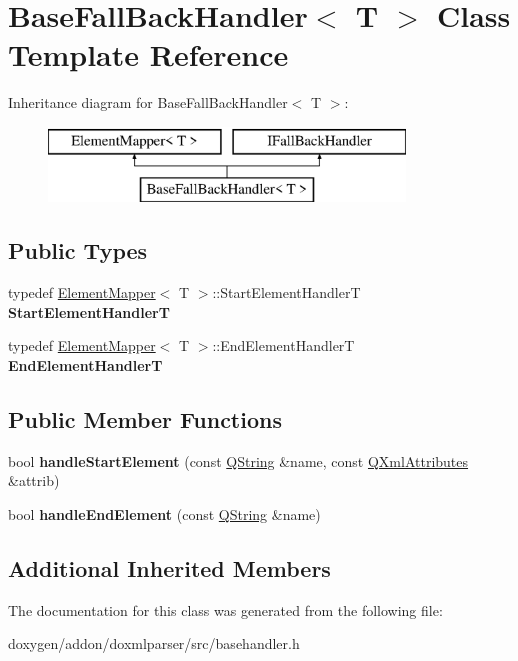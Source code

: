 \hypertarget{class_base_fall_back_handler}{}\section{Base\+Fall\+Back\+Handler$<$ T $>$ Class Template Reference}
\label{class_base_fall_back_handler}
Inheritance diagram for Base\+Fall\+Back\+Handler$<$ T $>$\+:\begin{figure}[H]
\begin{center}
\leavevmode
\includegraphics[height=2.000000cm]{class_base_fall_back_handler}
\end{center}
\end{figure}
\subsection*{Public Types}
\begin{DoxyCompactItemize}
\item 
\mbox{\label{class_base_fall_back_handler_ae0b24b5e229ec8d344add1a692d1df81}} 
typedef \mbox{\hyperlink{class_element_mapper}{Element\+Mapper}}$<$ T $>$\+::Start\+Element\+HandlerT {\bfseries Start\+Element\+HandlerT}
\item 
\mbox{\label{class_base_fall_back_handler_a8bc73d6cf9414a905eab6051beb1461e}} 
typedef \mbox{\hyperlink{class_element_mapper}{Element\+Mapper}}$<$ T $>$\+::End\+Element\+HandlerT {\bfseries End\+Element\+HandlerT}
\end{DoxyCompactItemize}
\subsection*{Public Member Functions}
\begin{DoxyCompactItemize}
\item 
\mbox{\label{class_base_fall_back_handler_a3664d08104bb0f5812bf7ab3b13b72ce}} 
bool {\bfseries handle\+Start\+Element} (const \mbox{\hyperlink{class_q_string}{Q\+String}} \&name, const \mbox{\hyperlink{class_q_xml_attributes}{Q\+Xml\+Attributes}} \&attrib)
\item 
\mbox{\label{class_base_fall_back_handler_a8cf173185ef67fb38094494cb90e341f}} 
bool {\bfseries handle\+End\+Element} (const \mbox{\hyperlink{class_q_string}{Q\+String}} \&name)
\end{DoxyCompactItemize}
\subsection*{Additional Inherited Members}


The documentation for this class was generated from the following file\+:\begin{DoxyCompactItemize}
\item 
doxygen/addon/doxmlparser/src/basehandler.\+h\end{DoxyCompactItemize}
